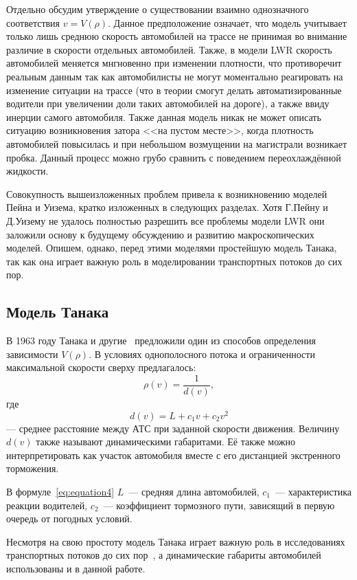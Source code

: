 Отдельно обсудим утверждение о существовании взаимно однозначного соответствия \(v=V(\rho)\).
Данное предположение означает, что модель учитывает только лишь среднюю скорость автомобилей на трассе не принимая во внимание различие в скорости отдельных автомобилей.
Также, в модели LWR скорость автомобилей меняется мнгновенно при изменении плотности, что противоречит реальным данным так как автомобилисты не могут моментально реагировать на изменение ситуации на трассе (что в теории смогут делать автоматизированные водители при увеличении доли таких автомобилей на дороге), а также ввиду инерции самого автомобиля.
Также данная модель никак не может описать ситуацию возникновения затора <<на пустом месте>>, когда плотность автомобилей повысилась и при небольшом возмущении на магистрали возникает пробка.
Данный процесс можно грубо сравнить с поведением переохлаждённой жидкости.

Совокупность вышеизложенных проблем привела к возникновению моделей Пейна и Уизема, кратко изложенных в следующих разделах.
Хотя Г.Пейну и Д.Уизему не удалось полностью разрешить все проблемы модели LWR они заложили основу к будущему обсуждению и развитию макроскопических моделей. 
Опишем, однако, перед этими моделями простейшую модель Танака, так как она играет важную роль в моделировании транспортных потоков до сих пор.

\subsection{Модель Танака}\label{subsec:ch1/sec1/sub2}
В 1963 году Танака и другие~\cite{inose1983control} предложили один из способов определения зависимости \( V(\rho) \).
В условиях однополосного потока и ограниченности максимальной скорости сверху предлагалось:
\[
\rho(v) = \frac{1}{d(v)},
\]
где
\begin{equation}
    \label{eq:equation4}
    d(v) = L + c_1v + c_2v^2
\end{equation}
--- среднее расстояние между АТС при заданной скорости движения.
Величину $d(v)$ также называют динамическими габаритами.
Её также можно интерпретировать как участок автомобиля вместе с его дистанцией экстренного торможения.

В формуле~\cref{eq:equation4} \(L\)~--- средняя длина автомобилей, \(c_1\)~--- характеристика реакции водителей, \(c_2\)~--- коэффициент тормозного пути, зависящий в первую очередь от погодных условий.

Несмотря на свою простоту модель Танака играет важную роль в исследованиях транспортных потоков до сих пор~\cite{gartner2002traffic}, а динамические габариты автомобилей использованы и в данной работе.


